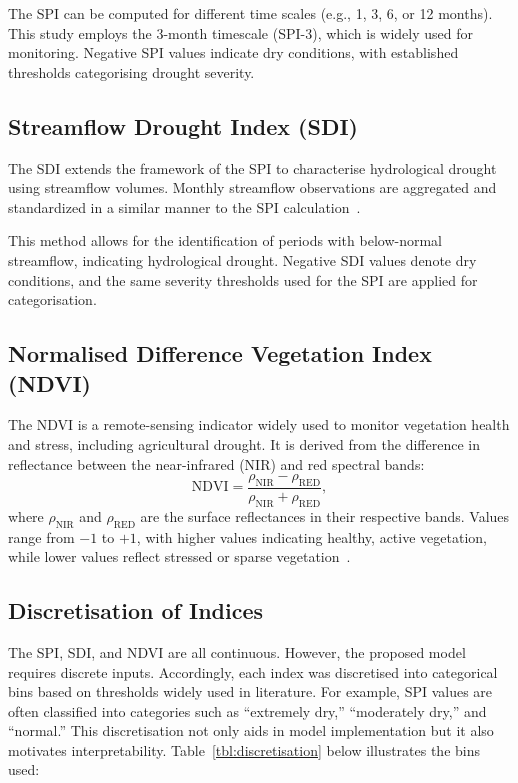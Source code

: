 The SPI can be computed for different time scales (e.g., 1, 3, 6, or 12 months). This study employs the 3-month timescale (SPI-3), which is widely used for monitoring. Negative SPI values indicate dry conditions, with established thresholds categorising drought severity.

\subsection{Streamflow Drought Index (SDI)}

The SDI extends the framework of the SPI to characterise hydrological drought using streamflow volumes. Monthly streamflow observations are aggregated and standardized in a similar manner to the SPI calculation~\cite{sdi_seminal_paper}.

This method allows for the identification of periods with below-normal streamflow, indicating hydrological drought. Negative SDI values denote dry conditions, and the same severity thresholds used for the SPI are applied for categorisation.

\subsection{Normalised Difference Vegetation Index (NDVI)}

The NDVI is a remote-sensing indicator widely used to monitor vegetation health and stress, including agricultural drought. It is derived from the difference in reflectance between the near-infrared (NIR) and red spectral bands:
\[
    \text{NDVI} = \frac{\rho_{\text{NIR}} - \rho_{\text{RED}}}{\rho_{\text{NIR}} + \rho_{\text{RED}}},
\]
where $\rho_{\text{NIR}}$ and $\rho_{\text{RED}}$ are the surface reflectances in their respective bands. Values range from $-1$ to $+1$, with higher values indicating healthy, active vegetation, while lower values reflect stressed or sparse vegetation~\cite{ndvi_seminal_paper}.

\subsection{Discretisation of Indices}
The SPI, SDI, and NDVI are all continuous. However, the proposed model requires discrete inputs. Accordingly, each index was discretised into categorical bins based on thresholds widely used in literature. For example, SPI values are often classified into categories such as “extremely dry,” “moderately dry,” and “normal.” This discretisation not only aids in model implementation but it also motivates interpretability. Table~\ref{tbl:discretisation} below illustrates the bins used:

